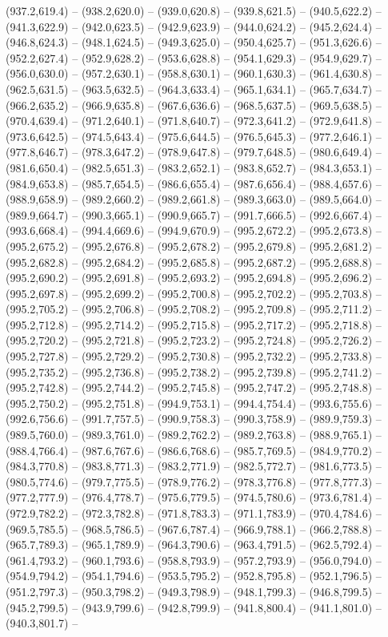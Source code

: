 (937.2,619.4) -- (938.2,620.0) -- (939.0,620.8) -- (939.8,621.5) -- (940.5,622.2) -- (941.3,622.9) -- (942.0,623.5) -- (942.9,623.9) -- (944.0,624.2) -- (945.2,624.4) -- (946.8,624.3) -- (948.1,624.5) -- (949.3,625.0) -- (950.4,625.7) -- (951.3,626.6) -- (952.2,627.4) -- (952.9,628.2) -- (953.6,628.8) -- (954.1,629.3) -- (954.9,629.7) -- (956.0,630.0) -- (957.2,630.1) -- (958.8,630.1) -- (960.1,630.3) -- (961.4,630.8) -- (962.5,631.5) -- (963.5,632.5) -- (964.3,633.4) -- (965.1,634.1) -- (965.7,634.7) -- (966.2,635.2) -- (966.9,635.8) -- (967.6,636.6) -- (968.5,637.5) -- (969.5,638.5) -- (970.4,639.4) -- (971.2,640.1) -- (971.8,640.7) -- (972.3,641.2) -- (972.9,641.8) -- (973.6,642.5) -- (974.5,643.4) -- (975.6,644.5) -- (976.5,645.3) -- (977.2,646.1) -- (977.8,646.7) -- (978.3,647.2) -- (978.9,647.8) -- (979.7,648.5) -- (980.6,649.4) -- (981.6,650.4) -- (982.5,651.3) -- (983.2,652.1) -- (983.8,652.7) -- (984.3,653.1) -- (984.9,653.8) -- (985.7,654.5) -- (986.6,655.4) -- (987.6,656.4) -- (988.4,657.6) -- (988.9,658.9) -- (989.2,660.2) -- (989.2,661.8) -- (989.3,663.0) -- (989.5,664.0) -- (989.9,664.7) -- (990.3,665.1) -- (990.9,665.7) -- (991.7,666.5) -- (992.6,667.4) -- (993.6,668.4) -- (994.4,669.6) -- (994.9,670.9) -- (995.2,672.2) -- (995.2,673.8) -- (995.2,675.2) -- (995.2,676.8) -- (995.2,678.2) -- (995.2,679.8) -- (995.2,681.2) -- (995.2,682.8) -- (995.2,684.2) -- (995.2,685.8) -- (995.2,687.2) -- (995.2,688.8) -- (995.2,690.2) -- (995.2,691.8) -- (995.2,693.2) -- (995.2,694.8) -- (995.2,696.2) -- (995.2,697.8) -- (995.2,699.2) -- (995.2,700.8) -- (995.2,702.2) -- (995.2,703.8) -- (995.2,705.2) -- (995.2,706.8) -- (995.2,708.2) -- (995.2,709.8) -- (995.2,711.2) -- (995.2,712.8) -- (995.2,714.2) -- (995.2,715.8) -- (995.2,717.2) -- (995.2,718.8) -- (995.2,720.2) -- (995.2,721.8) -- (995.2,723.2) -- (995.2,724.8) -- (995.2,726.2) -- (995.2,727.8) -- (995.2,729.2) -- (995.2,730.8) -- (995.2,732.2) -- (995.2,733.8) -- (995.2,735.2) -- (995.2,736.8) -- (995.2,738.2) -- (995.2,739.8) -- (995.2,741.2) -- (995.2,742.8) -- (995.2,744.2) -- (995.2,745.8) -- (995.2,747.2) -- (995.2,748.8) -- (995.2,750.2) -- (995.2,751.8) -- (994.9,753.1) -- (994.4,754.4) -- (993.6,755.6) -- (992.6,756.6) -- (991.7,757.5) -- (990.9,758.3) -- (990.3,758.9) -- (989.9,759.3) -- (989.5,760.0) -- (989.3,761.0) -- (989.2,762.2) -- (989.2,763.8) -- (988.9,765.1) -- (988.4,766.4) -- (987.6,767.6) -- (986.6,768.6) -- (985.7,769.5) -- (984.9,770.2) -- (984.3,770.8) -- (983.8,771.3) -- (983.2,771.9) -- (982.5,772.7) -- (981.6,773.5) -- (980.5,774.6) -- (979.7,775.5) -- (978.9,776.2) -- (978.3,776.8) -- (977.8,777.3) -- (977.2,777.9) -- (976.4,778.7) -- (975.6,779.5) -- (974.5,780.6) -- (973.6,781.4) -- (972.9,782.2) -- (972.3,782.8) -- (971.8,783.3) -- (971.1,783.9) -- (970.4,784.6) -- (969.5,785.5) -- (968.5,786.5) -- (967.6,787.4) -- (966.9,788.1) -- (966.2,788.8) -- (965.7,789.3) -- (965.1,789.9) -- (964.3,790.6) -- (963.4,791.5) -- (962.5,792.4) -- (961.4,793.2) -- (960.1,793.6) -- (958.8,793.9) -- (957.2,793.9) -- (956.0,794.0) -- (954.9,794.2) -- (954.1,794.6) -- (953.5,795.2) -- (952.8,795.8) -- (952.1,796.5) -- (951.2,797.3) -- (950.3,798.2) -- (949.3,798.9) -- (948.1,799.3) -- (946.8,799.5) -- (945.2,799.5) -- (943.9,799.6) -- (942.8,799.9) -- (941.8,800.4) -- (941.1,801.0) -- (940.3,801.7) -- 